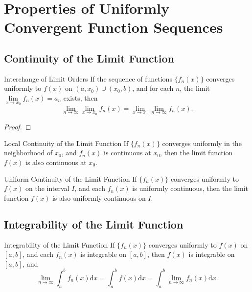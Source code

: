 \section{Properties of Uniformly Convergent Function Sequences}

\subsection{Continuity of the Limit Function}

\begin{theorem}{Interchange of Limit Orders}{}
  If the sequence of functions $\{f_n(x)\}$ converges uniformly to $f(x)$
  on $(a, x_0) \cup (x_0, b)$,
  and for each $n$, the limit $\lim \limits _{x \rightarrow x_0} f_n(x) = a_n$
  exists,
  then
  \begin{equation}
    \lim \limits _{n \rightarrow \infty} \lim \limits _{x \rightarrow x_0} f_n(x) = 
    \lim \limits _{x \rightarrow x_0} \lim \limits _{n \rightarrow \infty} f_n(x).
  \end{equation}
\end{theorem}

\begin{proof}
  
\end{proof}

\begin{theorem}{Local Continuity of the Limit Function}{}
  If $\{f_n(x)\}$ converges uniformly in the neighborhood of $x_0$,
  and $f_n(x)$ is continuous at $x_0$, then the limit function $f(x)$
  is also continuous at $x_0$.
\end{theorem}

\begin{theorem}{Uniform Continuity of the Limit Function}{}
  If $\{f_n(x)\}$ converges uniformly to $f(x)$ on the interval $I$,
  and each $f_n(x)$ is uniformly continuous,
  then the limit function $f(x)$ is also uniformly continuous on $I$.
\end{theorem}

\subsection{Integrability of the Limit Function}

\begin{theorem}{Integrability of the Limit Function}{}
  If $\{f_n(x)\}$ converges uniformly to $f(x)$ on $[a, b]$,
  and each $f_n(x)$ is integrable on $[a, b]$,
  then $f(x)$ is integrable on $[a, b]$, and
  \begin{equation}
    \lim \limits _{n \rightarrow \infty} \int_a^b f_n(x) \mathrm{d} x 
    = \int_a^b f(x)\mathrm{d} x = \int_a^b \lim \limits _{n \rightarrow \infty} f_n(x) \mathrm{d} x.
  \end{equation}
\end{theorem}



